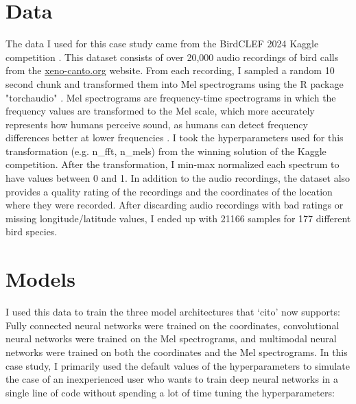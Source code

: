 \documentclass[12pt,twoside]{scrreport}
\newcommand{\pkg}[1]{`#1'}
\begin{document}
\section*{Data}
The data I used for this case study came from the BirdCLEF 2024 Kaggle competition \citep{birdclef-2024}. This dataset consists of over 20,000 audio recordings of bird calls from the \url{xeno-canto.org} website. From each recording, I sampled a random 10 second chunk and transformed them into Mel spectrograms using the R package "torchaudio" \citep{keydanaTorchaudioInterfacePytorchs2023}. Mel spectrograms are frequency-time spectrograms in which the frequency values are transformed to the Mel scale, which more accurately represents how humans perceive sound, as humans can detect frequency differences better at lower frequencies \citep{stevensScaleMeasurementPsychological1937}. I took the hyperparameters used for this transformation (e.g. n\_fft, n\_mels) from the winning solution of the Kaggle competition. After the transformation, I min-max normalized each spectrum to have values between 0 and 1. In addition to the audio recordings, the dataset also provides a quality rating of the recordings and the coordinates of the location where they were recorded. After discarding audio recordings with bad ratings or missing longitude/latitude values, I ended up with 21166 samples for 177 different bird species.

\section*{Models}
I used this data to train the three model architectures that \pkg{cito} now supports: Fully connected neural networks were trained on the coordinates, convolutional neural networks were trained on the Mel spectrograms, and multimodal neural networks were trained on both the coordinates and the Mel spectrograms. In this case study, I primarily used the default values of the hyperparameters to simulate the case of an inexperienced user who wants to train deep neural networks in a single line of code without spending a lot of time tuning the hyperparameters:
\end{document}
